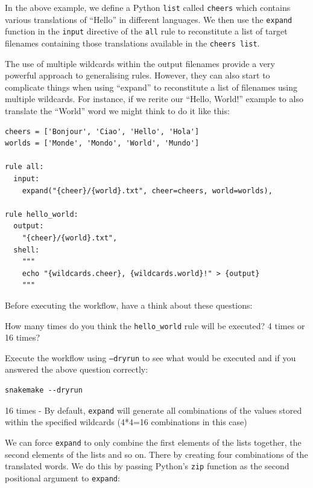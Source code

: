 In the above example, we define a Python \texttt{list} called \texttt{cheers} which contains various translations of ``Hello'' in different languages. We then
use the \texttt{expand} function in the \texttt{input} directive of the \texttt{all} rule to reconstitute a list of target filenames containing those
translations available in the \texttt{cheers list}.

\begin{bonus}

The use of multiple wildcards within the output filenames provide a very powerful approach to generalising rules. However, they can also start to complicate
things when using ``expand'' to reconstitute a list of filenames using multiple wildcards. For instance, if we rerite our ``Hello, World!'' example
to also translate the ``World'' word we might think to do it like this:

\begin{lstlisting}
cheers = ['Bonjour', 'Ciao', 'Hello', 'Hola']
worlds = ['Monde', 'Mondo', 'World', 'Mundo']

rule all:
  input:
    expand("{cheer}/{world}.txt", cheer=cheers, world=worlds),

rule hello_world:
  output:
    "{cheer}/{world}.txt",
  shell:
    """
    echo "{wildcards.cheer}, {wildcards.world}!" > {output}
    """
\end{lstlisting}

Before executing the workflow, have a think about these questions:

\begin{questions}

How many times do you think the \texttt{hello\_world} rule will be executed? 4 times or 16 times?

Execute the workflow using \texttt{--dryrun} to see what would be executed and if you answered the above question correctly:

\begin{lstlisting}
snakemake --dryrun
\end{lstlisting}

\begin{answer}
16 times - By default, \texttt{expand} will generate all combinations of the values stored within the specified wildcards (4*4=16 combinations in this case)
\end{answer}

\end{questions}

We can force \texttt{expand} to only combine the first elements of the lists together, the second elements of the lists and so on. There by creating four
combinations of the translated words. We do this by passing Python's \texttt{zip} function as the second positional argument to \texttt{expand}:


\end{bonus}

